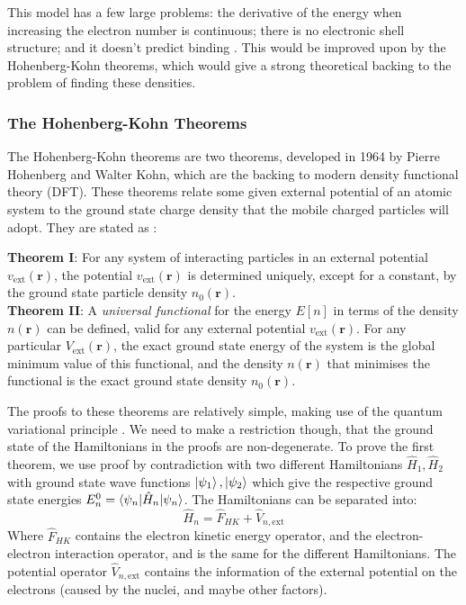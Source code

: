 \documentclass[12pt]{article}
\begin{document}
This model has a few large problems: the derivative of the energy when increasing the electron number is continuous; there is no electronic shell structure; and it doesn't predict binding \cite{lieb1977thomas}. This would be improved upon by the Hohenberg-Kohn theorems, which would give a strong theoretical backing to the problem of finding these densities.

\subsubsection{The Hohenberg-Kohn Theorems}
The Hohenberg-Kohn theorems \cite{PhysRev.136.B864} are two theorems, developed in 1964 by Pierre Hohenberg and Walter Kohn, which are the backing to modern density functional theory (DFT). These theorems relate some given external potential of an atomic system to the ground state charge density that the mobile charged particles will adopt. They are stated as \cite{martin_2004}:
\begin{displayquote}
	\textbf{Theorem I}: For any system of interacting particles in an external potential $v_\mathrm{ext}(\mathbf r)$, the potential $v_\mathrm{ext}(\mathbf r)$ is determined uniquely, except for a constant, by the ground state particle density $n_0(\mathbf{r})$.
\\
	\textbf{Theorem II}: A \textit{universal functional} for the energy $E[n]$ in terms of the density $n(\mathbf r)$ can be defined, valid for any external potential $v_\mathrm{ext}(\mathbf r)$.
For any particular $V_\mathrm{ext}(\mathbf r)$, the exact ground state energy of the system is the global minimum value of this functional, and the density $n(\mathbf r)$ that minimises the functional is the exact ground state density $n_0(\mathbf r)$.
\end{displayquote}
The proofs to these theorems are relatively simple, making use of the quantum variational principle \cite{shankar2012principles}. We need to make a restriction though, that the ground state of the Hamiltonians in the proofs are non-degenerate.
To prove the first theorem, we use proof by contradiction with two different Hamiltonians $\hat H_1, \hat H_2$ with ground state wave functions $\ket{\psi_1}, \ket{\psi_2}$ which give the respective ground state energies $E^0_n=\braket{\psi_n | \hat H_n | \psi_n}$. 
The Hamiltonians can be separated into:
\begin{equation}
\hat H_n = \hat F_{HK} + \hat V_{n, \mathrm{ext}}
\end{equation}
Where $\hat F_{HK}$ contains the electron kinetic energy operator, and the electron-electron interaction operator, and is the same for the different Hamiltonians. The potential operator $\hat V_{n, \mathrm{ext}}$ contains the information of the external potential on the electrons (caused by the nuclei, and maybe other factors).
\end{document}
